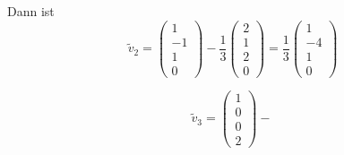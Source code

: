\documentclass[12pt]{article}
\begin{document}
Dann ist
$$
    \tilde v_2 = \begin{pmatrix} 1 \\ -1 \\ 1 \\ 0 \end{pmatrix} - \frac{1}{3} \begin{pmatrix} 2 \\ 1 \\ 2 \\ 0 \end{pmatrix} = \frac{1}{3} \begin{pmatrix} 1 \\ -4 \\ 1 \\ 0 \end{pmatrix}
$$

$$
    \tilde v_3 = \begin{pmatrix} 1 \\ 0 \\ 0 \\ 2 \end{pmatrix} - \frac{}{}
$$
\end{document}
